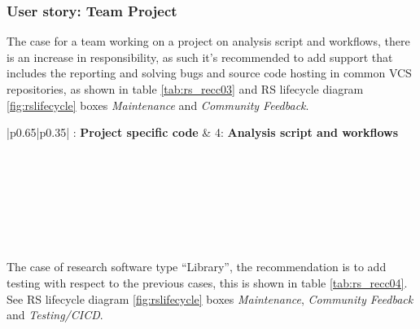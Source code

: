 \subsubsection{User story: Team Project}

The case for a team working on a project on analysis script and workflows, there is an increase in responsibility, as such it's recommended to add support that includes the reporting and solving bugs and source code hosting in common VCS repositories, as shown in table \ref{tab:rs_recc03} and RS lifecycle diagram \ref{fig:rslifecycle} boxes \textit{Maintenance} and \textit{Community Feedback}.

\begin{center}
    \tabletail{\hline}
    \label{tab:rs_recc03}
    \small
    \begin{supertabular}{|p{0.65\linewidth}|p{0.35\linewidth}|} : \textbf{Project specific code} &
    4: \textbf{Analysis script and workflows} \\ \hline \hline

     \\ \hline
     \\ \hline
     \\ \hline
     \\ \hline
     \\ \hline
     \\ \hline

\end{supertabular}
\end{center}

The case of research software type ``Library'', the recommendation is to add testing with respect to the previous cases, this is shown in table \ref{tab:rs_recc04}.
See RS lifecycle diagram \ref{fig:rslifecycle} boxes \textit{Maintenance}, \textit{Community Feedback} and \textit{Testing/CICD}.

